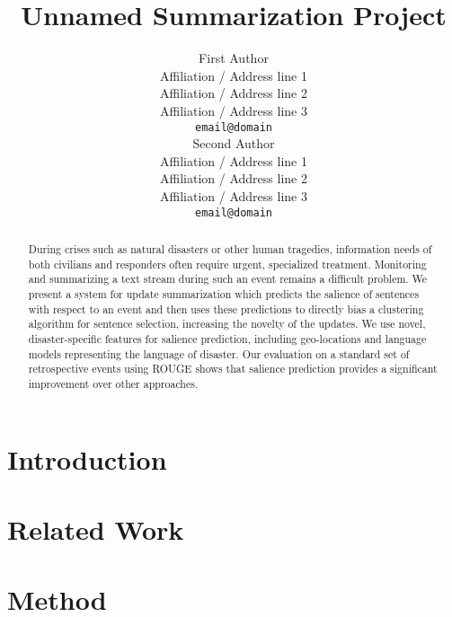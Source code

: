 \documentclass[11pt]{article}
\title{Unnamed Summarization Project}
\author{First Author \\
  Affiliation / Address line 1 \\
  Affiliation / Address line 2 \\
  Affiliation / Address line 3 \\
  {\tt email@domain} \\\And
  Second Author \\
  Affiliation / Address line 1 \\
  Affiliation / Address line 2 \\
  Affiliation / Address line 3 \\
  {\tt email@domain} \\}
\date{}
\begin{document}
\maketitle
\begin{abstract}
During crises such as natural disasters or other human tragedies, information
needs of both civilians and responders often require urgent, specialized
treatment.  
Monitoring and summarizing a text stream
during such an event remains a difficult problem. 
We present a system for update summarization which predicts the salience of 
sentences with respect to an event and then uses these
predictions to directly bias a clustering algorithm for sentence selection,
increasing the novelty of the updates. We use novel, disaster-specific features
for salience prediction, including geo-locations and language models
representing the language of disaster.
Our evaluation on a standard set of retrospective events using ROUGE shows 
that salience prediction provides a significant improvement over 
other approaches.



\end{abstract}

\section{Introduction}



\section{Related Work}


%


\section{Method}

\end{document}
